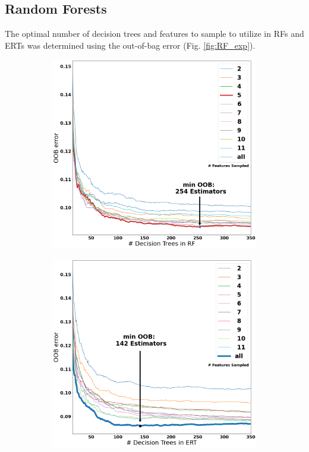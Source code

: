 \documentclass[a4paper, twoside, final, 12pt]{article}
\begin{document}
{\subsection{Random Forests}

The optimal number of decision trees and features to sample to utilize in RFs and ERTs was determined using the out-of-bag error (Fig. \ref{fig:RF_exp}). 
\begin{figure}[h!]
	\begin{subfigure}{0.48\linewidth}
		\centering
		\includegraphics[scale=0.19]{./src/RF_oob_error}
				\caption{}
		\label{subfig:RF_oob}
	\end{subfigure}
	\begin{subfigure}{0.5\linewidth}
		\centering
		\includegraphics[scale=0.19]{./src/ERT_oob_error}

\end{subfigure}
\end{figure}}
\end{document}

